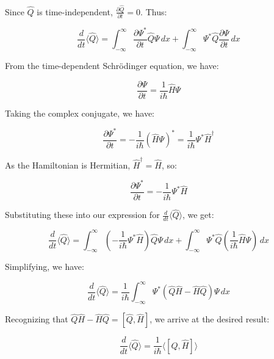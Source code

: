 \documentclass{article}
\begin{document}
\noindent Since $\hat{Q}$ is time-independent, $\frac{\partial \hat{Q}}{\partial t} = 0$. Thus:

\begin{equation}
\frac{d}{dt} \langle \hat{Q} \rangle = \int_{-\infty}^{\infty} \frac{\partial \Psi^*}{\partial t} \hat{Q} \Psi \, dx + \int_{-\infty}^{\infty} \Psi^* \hat{Q} \frac{\partial \Psi}{\partial t} \, dx
\end{equation}

\noindent From the time-dependent Schrödinger equation, we have:

\begin{equation}
\frac{\partial \Psi}{\partial t} = \frac{1}{i\hbar} \hat{H} \Psi
\end{equation}

\noindent Taking the complex conjugate, we have:

\begin{equation}
\frac{\partial \Psi^*}{\partial t} = -\frac{1}{i\hbar} (\hat{H} \Psi)^* = \frac{1}{i\hbar} \Psi^* \hat{H}^\dagger
\end{equation}

\noindent As the Hamiltonian is Hermitian, $\hat{H}^\dagger = \hat{H}$, so:

\begin{equation}
\frac{\partial \Psi^*}{\partial t} = -\frac{1}{i\hbar} \Psi^* \hat{H}
\end{equation}

\noindent Substituting these into our expression for $\frac{d}{dt} \langle \hat{Q} \rangle$, we get:

\begin{equation}
\frac{d}{dt} \langle \hat{Q} \rangle = \int_{-\infty}^{\infty} \left( -\frac{1}{i\hbar} \Psi^* \hat{H} \right) \hat{Q} \Psi \, dx + \int_{-\infty}^{\infty} \Psi^* \hat{Q} \left( \frac{1}{i\hbar} \hat{H} \Psi \right) \, dx
\end{equation}

\noindent Simplifying, we have:

\begin{equation}
\frac{d}{dt} \langle \hat{Q} \rangle = \frac{1}{i\hbar} \int_{-\infty}^{\infty} \Psi^* (\hat{Q}\hat{H} - \hat{H}\hat{Q}) \Psi \, dx
\end{equation}

\noindent Recognizing that $\hat{Q}\hat{H} - \hat{H}\hat{Q} = [\hat{Q}, \hat{H}]$, we arrive at the desired result:

\begin{equation}
\frac{d}{dt} \langle \hat{Q} \rangle = \frac{1}{i\hbar} \langle [\hat{Q}, \hat{H}] \rangle
\end{equation}
\end{document}
